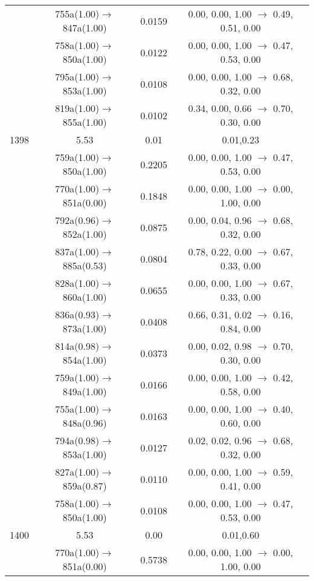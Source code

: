 \documentclass[10pt,a4paper]{article}
\begin{document}
\begin{longtable}{c|c|c|c}
 	& 755a(1.00)$\rightarrow$847a(1.00) &	 0.0159 &	 0.00, 0.00, 1.00 $\rightarrow$ 0.49, 0.51, 0.00 \\ 
 	& 758a(1.00)$\rightarrow$850a(1.00) &	 0.0122 &	 0.00, 0.00, 1.00 $\rightarrow$ 0.47, 0.53, 0.00 \\ 
 	& 795a(1.00)$\rightarrow$853a(1.00) &	 0.0108 &	 0.00, 0.00, 1.00 $\rightarrow$ 0.68, 0.32, 0.00 \\ 
 	& 819a(1.00)$\rightarrow$855a(1.00) &	 0.0102 &	 0.34, 0.00, 0.66 $\rightarrow$ 0.70, 0.30, 0.00 \\ 
 \hline1398 &	 5.53 &	 0.01 &	 0.01,0.23 \\ 
  	& 759a(1.00)$\rightarrow$850a(1.00) &	 0.2205 &	 0.00, 0.00, 1.00 $\rightarrow$ 0.47, 0.53, 0.00 \\ 
 	& 770a(1.00)$\rightarrow$851a(0.00) &	 0.1848 &	 0.00, 0.00, 1.00 $\rightarrow$ 0.00, 1.00, 0.00 \\ 
 	& 792a(0.96)$\rightarrow$852a(1.00) &	 0.0875 &	 0.00, 0.04, 0.96 $\rightarrow$ 0.68, 0.32, 0.00 \\ 
 	& 837a(1.00)$\rightarrow$885a(0.53) &	 0.0804 &	 0.78, 0.22, 0.00 $\rightarrow$ 0.67, 0.33, 0.00 \\ 
 	& 828a(1.00)$\rightarrow$860a(1.00) &	 0.0655 &	 0.00, 0.00, 1.00 $\rightarrow$ 0.67, 0.33, 0.00 \\ 
 	& 836a(0.93)$\rightarrow$873a(1.00) &	 0.0408 &	 0.66, 0.31, 0.02 $\rightarrow$ 0.16, 0.84, 0.00 \\ 
 	& 814a(0.98)$\rightarrow$854a(1.00) &	 0.0373 &	 0.00, 0.02, 0.98 $\rightarrow$ 0.70, 0.30, 0.00 \\ 
 	& 759a(1.00)$\rightarrow$849a(1.00) &	 0.0166 &	 0.00, 0.00, 1.00 $\rightarrow$ 0.42, 0.58, 0.00 \\ 
 	& 755a(1.00)$\rightarrow$848a(0.96) &	 0.0163 &	 0.00, 0.00, 1.00 $\rightarrow$ 0.40, 0.60, 0.00 \\ 
 	& 794a(0.98)$\rightarrow$853a(1.00) &	 0.0127 &	 0.02, 0.02, 0.96 $\rightarrow$ 0.68, 0.32, 0.00 \\ 
 	& 827a(1.00)$\rightarrow$859a(0.87) &	 0.0110 &	 0.00, 0.00, 1.00 $\rightarrow$ 0.59, 0.41, 0.00 \\ 
 	& 758a(1.00)$\rightarrow$850a(1.00) &	 0.0108 &	 0.00, 0.00, 1.00 $\rightarrow$ 0.47, 0.53, 0.00 \\ 
 \hline1400 &	 5.53 &	 0.00 &	 0.01,0.60 \\ 
  	& 770a(1.00)$\rightarrow$851a(0.00) &	 0.5738 &	 0.00, 0.00, 1.00 $\rightarrow$ 0.00, 1.00, 0.00 \\ 

\end{longtable}
\end{document}
